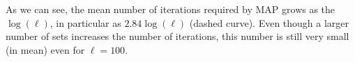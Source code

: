\documentclass{article}
\begin{document}
As we can see, the mean number of iterations required by MAP grows as the $\log(\ell)$, in particular as $2.84 \log(\ell)$ (dashed curve). Even though a larger number of sets increases the number of iterations, this number is still very small (in mean) even for $\ell = 100$.





\end{document}
